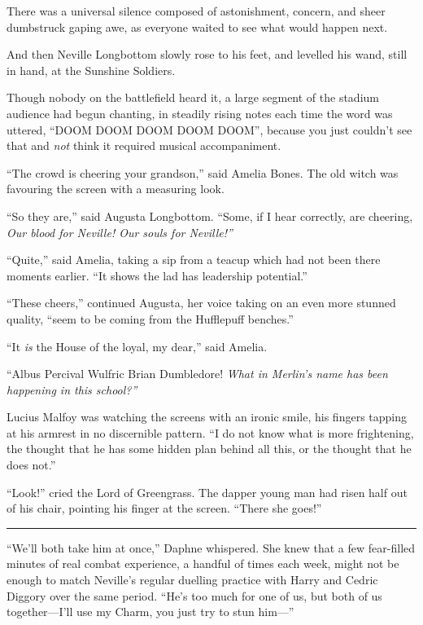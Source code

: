 There was a universal silence composed of astonishment, concern, and
sheer dumbstruck gaping awe, as everyone waited to see what would happen
next.

And then Neville Longbottom slowly rose to his feet, and levelled his
wand, still in hand, at the Sunshine Soldiers.

Though nobody on the battlefield heard it, a large segment of the
stadium audience had begun chanting, in steadily rising notes each time
the word was uttered, ``DOOM DOOM DOOM DOOM DOOM'', because you just
couldn't see that and \emph{not} think it required musical
accompaniment.

``The crowd is cheering your grandson,'' said Amelia Bones. The old
witch was favouring the screen with a measuring look.

``So they are,'' said Augusta Longbottom. ``Some, if I hear correctly,
are cheering, \emph{Our blood for Neville! Our souls for Neville!''}

``Quite,'' said Amelia, taking a sip from a teacup which had not been
there moments earlier. ``It shows the lad has leadership potential.''

``These cheers,'' continued Augusta, her voice taking on an even more
stunned quality, ``seem to be coming from the Hufflepuff benches.''

``It \emph{is} the House of the loyal, my dear,'' said Amelia.

``Albus Percival Wulfric Brian Dumbledore! \emph{What in Merlin's name
has been happening in this school?''}

Lucius Malfoy was watching the screens with an ironic smile, his fingers
tapping at his armrest in no discernible pattern. ``I do not know what
is more frightening, the thought that he has some hidden plan behind all
this, or the thought that he does not.''

``Look!'' cried the Lord of Greengrass. The dapper young man had risen
half out of his chair, pointing his finger at the screen. ``There she
goes!''

\begin{center}\rule{3in}{0.4pt}\end{center}

``We'll both take him at once,'' Daphne whispered. She knew that a few
fear-filled minutes of real combat experience, a handful of times each
week, might not be enough to match Neville's regular duelling practice
with Harry and Cedric Diggory over the same period. ``He's too much for
one of us, but both of us together---I'll use my Charm, you just try to
stun him---''

